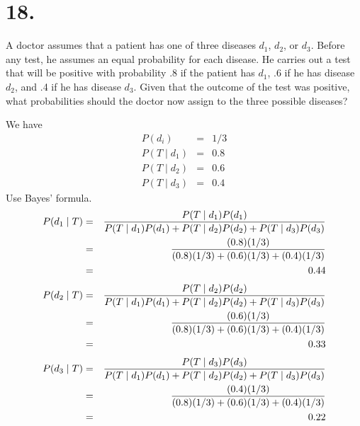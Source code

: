 \section*{18.}
A doctor assumes that a patient has one of three diseases
$d_1$, $d_2$, or $d_3$. Before
any test, he assumes an equal probability for each disease.
He carries out a
test that will be positive with probability {.}8 if the patient has $d_1$,
{.}6 if he has
disease $d_2$, and {.}4 if he has disease $d_3$.
Given that the outcome of the test was
positive, what probabilities should the doctor now assign to the three possible
diseases?

\bigskip
\noindent
We have
\begin{eqnarray*}
P(d_i)&=&1/3\\
P(T\mid d_1)&=&0.8\\
P(T\mid d_2)&=&0.6\\
P(T\mid d_3)&=&0.4
\end{eqnarray*}
Use Bayes' formula.
\begin{eqnarray*}
P(d_1\mid T)&=&{P(T\mid d_1)P(d_1)
\over P(T\mid d_1)P(d_1)+P(T\mid d_2)P(d_2)+P(T\mid d_3)P(d_3)
}\\
&=&{(0.8)(1/3)\over(0.8)(1/3)+(0.6)(1/3)+(0.4)(1/3)}\\
&=&0.44
\end{eqnarray*}
%
\begin{eqnarray*}
P(d_2\mid T)&=&{P(T\mid d_2)P(d_2)
\over P(T\mid d_1)P(d_1)+P(T\mid d_2)P(d_2)+P(T\mid d_3)P(d_3)
}\\
&=&{(0.6)(1/3)\over(0.8)(1/3)+(0.6)(1/3)+(0.4)(1/3)}\\
&=&0.33
\end{eqnarray*}
%
\begin{eqnarray*}
P(d_3\mid T)&=&{P(T\mid d_3)P(d_3)
\over P(T\mid d_1)P(d_1)+P(T\mid d_2)P(d_2)+P(T\mid d_3)P(d_3)
}\\
&=&{(0.4)(1/3)\over(0.8)(1/3)+(0.6)(1/3)+(0.4)(1/3)}\\
&=&0.22
\end{eqnarray*}

